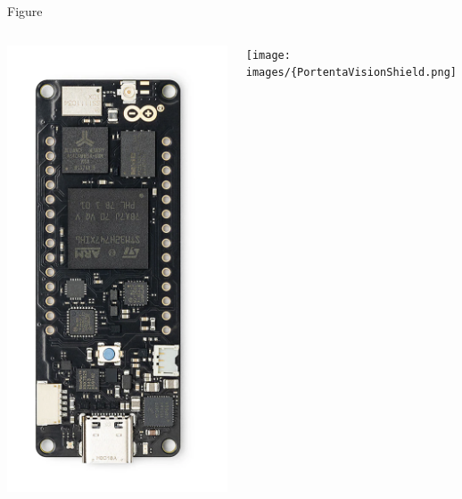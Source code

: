 \begin{frame}{Figure}
	
	\begin{columns}
		\centering
		\includegraphics[width=\textwidth]{images/ArduinoPortentaH7.png}
		
		\centering
		\texttt{[image: images/\{PortentaVisionShield.png]}
	\end{columns}
	
\end{frame}